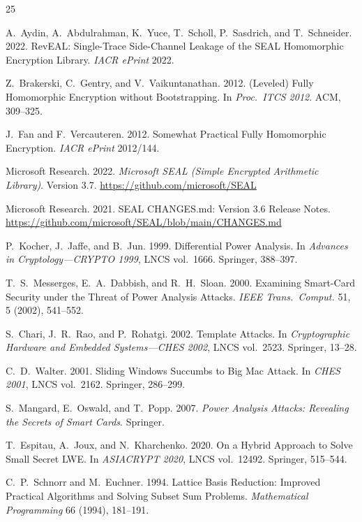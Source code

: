 \documentclass[sigconf,nonacm]{acmart}
\begin{document}
\sloppy

\begin{thebibliography}{25}

A.~Aydin, A.~Abdulrahman, K.~Yuce, T.~Scholl, P.~Sasdrich, and T.~Schneider. 2022.
RevEAL: Single-Trace Side-Channel Leakage of the SEAL Homomorphic Encryption Library.
\textit{IACR ePrint} 2022.

Z.~Brakerski, C.~Gentry, and V.~Vaikuntanathan. 2012. (Leveled) Fully Homomorphic
Encryption without Bootstrapping. In \textit{Proc.\ ITCS 2012}. ACM, 309--325.

J.~Fan and F.~Vercauteren. 2012. Somewhat Practical Fully Homomorphic Encryption.
\textit{IACR ePrint} 2012/144.

Microsoft Research. 2022. \textit{Microsoft SEAL (Simple Encrypted Arithmetic Library)}.
Version 3.7. \url{https://github.com/microsoft/SEAL}

Microsoft Research. 2021. SEAL CHANGES.md: Version 3.6 Release Notes.
\url{https://github.com/microsoft/SEAL/blob/main/CHANGES.md}

P.~Kocher, J.~Jaffe, and B.~Jun. 1999. Differential Power Analysis. In
\textit{Advances in Cryptology---CRYPTO 1999}, LNCS vol.~1666. Springer, 388--397.

T.~S.~Messerges, E.~A.~Dabbish, and R.~H.~Sloan. 2000. Examining Smart-Card Security
under the Threat of Power Analysis Attacks. \textit{IEEE Trans.\ Comput.} 51, 5
(2002), 541--552.

S.~Chari, J.~R.~Rao, and P.~Rohatgi. 2002. Template Attacks. In
\textit{Cryptographic Hardware and Embedded Systems---CHES 2002}, LNCS vol.~2523.
Springer, 13--28.

C.~D.~Walter. 2001. Sliding Windows Succumbs to Big Mac Attack. In
\textit{CHES 2001}, LNCS vol.~2162. Springer, 286--299.

S.~Mangard, E.~Oswald, and T.~Popp. 2007. \textit{Power Analysis Attacks: Revealing
the Secrets of Smart Cards}. Springer.

T.~Espitau, A.~Joux, and N.~Kharchenko. 2020. On a Hybrid Approach to Solve Small
Secret LWE. In \textit{ASIACRYPT 2020}, LNCS vol.~12492. Springer, 515--544.

C.~P.~Schnorr and M.~Euchner. 1994. Lattice Basis Reduction: Improved Practical
Algorithms and Solving Subset Sum Problems. \textit{Mathematical Programming}
66 (1994), 181--191.


\end{thebibliography}
\end{document}
